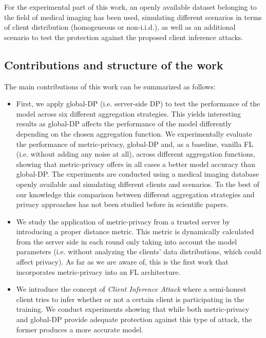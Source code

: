 \documentclass[5p,times]{elsarticle}
\begin{document}
For the experimental part of this work, an openly available dataset belonging to the field of medical imaging has been used, simulating different scenarios in terms of client distribution (homogeneous or non-i.i.d.), as well as an additional scenario to test the protection against the proposed client inference attacks.

\subsection{Contributions and structure of the work}
The main contributions of this work can be summarized as follows:
\begin{itemize}
    \item First, we apply global-DP (i.e. server-side DP) to test the performance of the model across six different aggregation strategies. 
    This yields interesting results as global-DP affects the performance of the model differently depending on the chosen aggregation function. We experimentally evaluate the performance of metric-privacy, global-DP and, as a baseline, vanilla FL (i.e. without adding any noise at all), across different aggregation functions, showing that metric-privacy offers in all cases a better model accuracy than global-DP. The experiments are conducted using a medical imaging database openly available and simulating different clients and scenarios. To the best of our knowledge this comparison between different aggregation strategies and privacy approaches has not been studied before in scientific papers. 
    
    \item We study the application of metric-privacy from a trusted server by introducing a proper distance metric. 
    This metric is dynamically calculated from the server side in each round only taking into account the model parameters (i.e. without analyzing the clients' data distributions, which could affect privacy). 
    As far as we are aware of, this is the first work that incorporates metric-privacy into an FL architecture. %
    
    \item We introduce the concept of \emph{Client Inference Attack} where a semi-honest client tries to  infer whether or not a certain client is participating in the training. We conduct experiments showing that while both metric-privacy and global-DP provide adequate protection against this type of attack, the former produces a more accurate model. 
\end{itemize}
\end{document}
